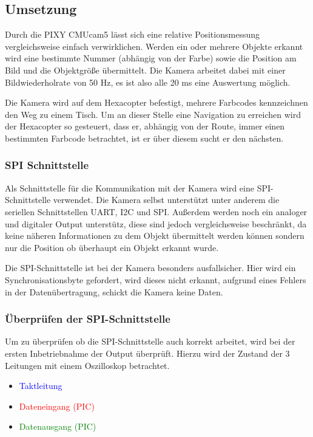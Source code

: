 \needspace{2cm}

  \subsection{Umsetzung}
  Durch die PIXY CMUcam5 lässt sich eine relative Positionsmessung vergleichsweise einfach verwirklichen.
  Werden ein oder mehrere Objekte erkannt wird eine bestimmte Nummer (abhängig von der Farbe) sowie die Position am Bild und die Objektgröße übermittelt.
  Die Kamera arbeitet dabei mit einer Bildwiederholrate von 50 Hz, es ist also alle 20 ms eine Auswertung möglich.

  Die Kamera wird auf dem Hexacopter befestigt, mehrere Farbcodes kennzeichnen den Weg zu einem Tisch.
  Um an dieser Stelle eine Navigation zu erreichen wird der Hexacopter so gesteuert, dass er, abhängig von der Route,
  immer einen bestimmten Farbcode betrachtet, ist er über diesem sucht er den nächsten.

    \subsubsection{SPI Schnittstelle}
    Als Schnittstelle für die Kommunikation mit der Kamera wird eine SPI-Schnittstelle verwendet.
    Die Kamera selbst unterstützt unter anderem die seriellen Schnittstellen UART, I2C und SPI.
    Außerdem werden noch ein analoger und digitaler Output unterstütz, diese sind jedoch vergleichsweise beschränkt,
    da keine näheren Informationen zu dem Objekt übermittelt werden können sondern nur die Position \bzw ob überhaupt ein Objekt erkannt wurde.

    Die SPI-Schnittstelle ist bei der Kamera besonders ausfallsicher. Hier wird ein Synchronisationsbyte gefordert, wird dieses nicht erkannt,
    \zB aufgrund eines Fehlers in der Datenübertragung, schickt die Kamera keine Daten.

    \subsubsection*{Überprüfen der SPI-Schnittstelle}
    Um zu überprüfen ob die SPI-Schnittstelle auch korrekt arbeitet, wird bei der ersten Inbetriebnahme der Output überprüft.
    Hierzu wird der Zustand der 3 Leitungen mit einem Oszilloskop betrachtet.
    \begin{itemize}
      \item \textcolor{blue}{Taktleitung}
      \item \textcolor{red}{Dateneingang (PIC)}
      \item \textcolor{green}{Datenausgang (PIC)}
    \end{itemize}

